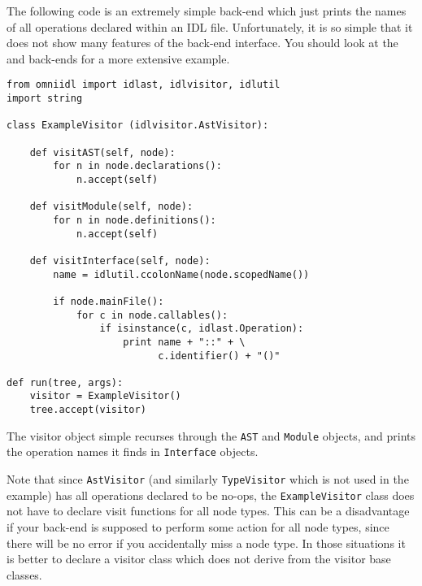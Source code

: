 \documentclass[11pt,twoside,a4paper]{article}
\newcommand{\class}[1]{\texttt{#1}}
\newcommand{\file}{\begingroup \urlstyle{tt}\Url}
\begin{document}
The following code is an extremely simple back-end which just prints
the names of all operations declared within an IDL file.
Unfortunately, it is so simple that it does not show many features of
the back-end interface. You should look at the \file{dump.py} and
\file{python.py} back-ends for a more extensive example.

\begin{verbatim}
from omniidl import idlast, idlvisitor, idlutil
import string

class ExampleVisitor (idlvisitor.AstVisitor):

    def visitAST(self, node):
        for n in node.declarations():
            n.accept(self)

    def visitModule(self, node):
        for n in node.definitions():
            n.accept(self)

    def visitInterface(self, node):
        name = idlutil.ccolonName(node.scopedName())

        if node.mainFile():
            for c in node.callables():
                if isinstance(c, idlast.Operation):
                    print name + "::" + \
                          c.identifier() + "()"

def run(tree, args):
    visitor = ExampleVisitor()
    tree.accept(visitor)
\end{verbatim}

\noindent
The visitor object simple recurses through the \class{AST} and
\class{Module} objects, and prints the operation names it finds in
\class{Interface} objects.

Note that since \class{AstVisitor} (and similarly \class{TypeVisitor}
which is not used in the example) has all operations declared to be
no-ops, the \class{ExampleVisitor} class does not have to declare
visit functions for all node types. This can be a disadvantage if your
back-end is supposed to perform some action for all node types, since
there will be no error if you accidentally miss a node type. In those
situations it is better to declare a visitor class which does not
derive from the visitor base classes.
\end{document}
